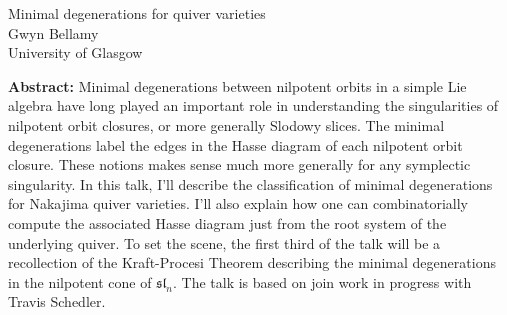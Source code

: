 \documentclass[12pt,a4paper]{article}
\begin{document}
\thispagestyle{empty} 
\begin{center}
{\large  Minimal degenerations for quiver varieties}\\
\vspace*{.5cm}
Gwyn Bellamy\\
University of Glasgow\\
\end{center}
\vspace*{.8cm}

{\bf Abstract:} Minimal degenerations between nilpotent orbits in a simple Lie algebra have long played an important role in understanding the singularities of nilpotent orbit closures, or more generally Slodowy slices. The minimal degenerations label the edges in the Hasse diagram of each nilpotent orbit closure. These notions makes sense much more generally for any symplectic singularity. In this talk, I'll describe the classification of minimal degenerations for Nakajima quiver varieties. I'll also explain how one can combinatorially compute the associated Hasse diagram just from the root system of the underlying quiver. To set the scene, the first third of the talk will be a recollection of the Kraft-Procesi Theorem describing the minimal degenerations in the nilpotent cone of $\mathfrak{sl}_n$. The talk is based on join work in progress with Travis Schedler.
\end{document}
